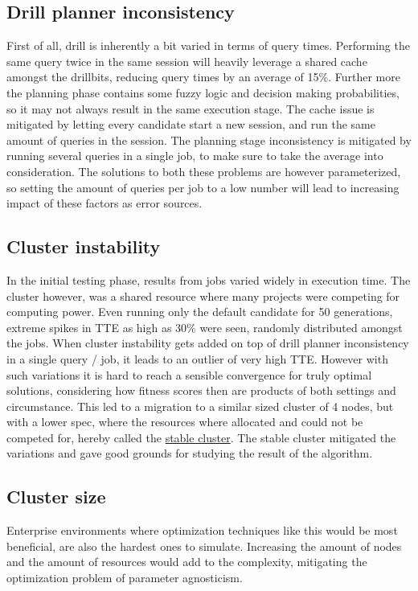 \documentclass[a4paper,english]{report}
\begin{document}
		\subsection{Drill planner inconsistency}
		First of all, drill is inherently a bit varied in terms of query times. Performing the same query twice in the same session will heavily leverage a shared cache amongst the drillbits, reducing query times by an average of 15\%. Further more the planning phase contains some fuzzy logic and decision making probabilities, so it may not always result in the same execution stage. The cache issue is mitigated by letting every candidate start a new session, and run the same amount of queries in the session. The planning stage inconsistency is mitigated by running several queries in a single job, to make sure to take the average into consideration. The solutions to both these problems are however parameterized, so setting the amount of queries per job to a low number will lead to increasing impact of these factors as error sources.
		\subsection{Cluster instability}
		In the initial testing phase, results from jobs varied widely in execution time. The cluster however, was a shared resource where many projects were competing for computing power. Even running only the default candidate for 50 generations, extreme spikes in TTE as high as 30\% were seen, randomly distributed amongst the jobs. When cluster instability gets added on top of drill planner inconsistency in a single query / job, it leads to an outlier of very high TTE. However with such variations it is hard to reach a sensible convergence for truly optimal solutions, considering how fitness scores then are products of both settings and circumstance. This led to a migration to a similar sized cluster of 4 nodes, but with a lower spec, where the resources where allocated and could not be competed for, hereby called the \hyperref[table:cluster_stable]{stable cluster}. The stable cluster mitigated the variations and gave good grounds for studying the result of the algorithm. 
		\subsection{Cluster size}
		Enterprise environments where optimization techniques like this would be most beneficial, are also the hardest ones to simulate. Increasing the amount of nodes and the amount of resources would add to the complexity, mitigating the optimization problem of parameter agnosticism. 
	\pagebreak
\end{document}
